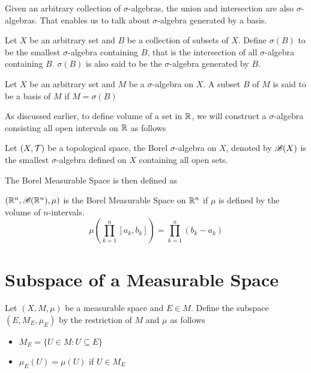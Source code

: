 \documentclass{report}
\begin{document}
Given an arbitrary collection of $\sigma$-algebras, the union and intersection are also $\sigma$-algebras. That enables us to talk about $\sigma$-algebra generated by a basis.

\begin{definition}
    Let $X$ be an arbitrary set and $B$ be a collection of subsets of $X$. Define $\sigma(B)$ to be the smallest $\sigma$-algebra containing $B$, that is the intersection of all $\sigma$-algebra containing $B$. $\sigma(B)$ is also said to be the $\sigma$-algebra generated by $B$.
\end{definition}

\begin{definition}
    Let $X$ be an arbitrary set and $M$ be a $\sigma$-algebra on $X$. A subset $B$ of $M$ is said to be a basis of $M$ if $M = \sigma(B)$
\end{definition}

As discussed earlier, to define volume of a set in $\mathbb{R}$, we will construct a $\sigma$-algebra consisting all open intervals on $\mathbb{R}$ as follows

\begin{definition}
    Let $(X, \mathcal{T})$ be a topological space, the Borel $\sigma$-algebra on $X$, denoted by $\mathscr{B}(X)$ is the smallest $\sigma$-algebra defined on $X$ containing all open sets.
\end{definition}

The Borel Measurable Space is then defined as 

\begin{definition}
    $(\mathbb{R}^n, \mathscr{B}(\mathbb{R}^n), \mu)$ is the Borel Measurable Space on $\mathbb{R}^n$ if $\mu$ is defined by the volume of $n$-intervals.
    \[
        \mu\left(\prod_{k=1}^n [a_k, b_k]\right) = \prod_{k=1}^n (b_k - a_k)
    \]
\end{definition}

\section{Subspace of a Measurable Space}

\begin{definition}
    Let $(X, M, \mu)$ be a measurable space and $E \in M$. Define the subspace $(E, M_E, \mu_E)$ by the restriction of $M$ and $\mu$ as follows
    \begin{itemize}
        \item $M_E = \{U \in M: U \subseteq E \}$
        \item $\mu_E(U) = \mu(U)$ if $U \in M_E$
    \end{itemize}
\end{definition}
\end{document}
